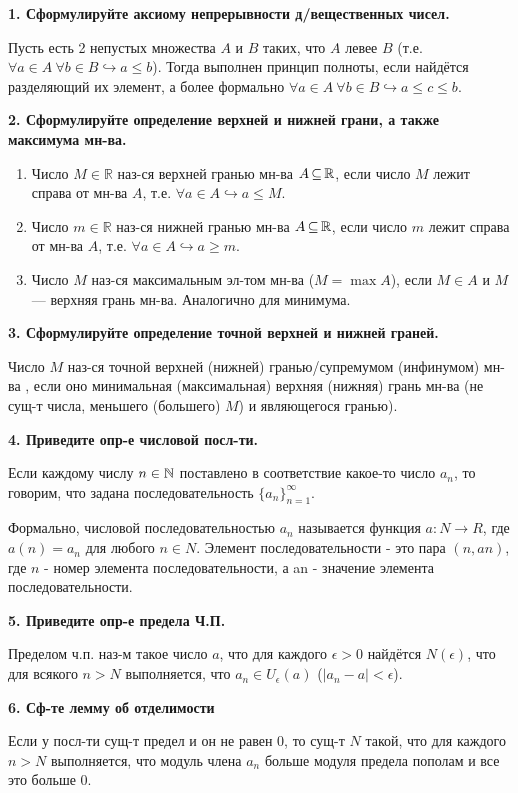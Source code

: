 


	\textbf{1. Сформулируйте аксиому непрерывности д/вещественных чисел.}
	
	Пусть есть 2 непустых множества $A$ и $B$ таких, что $A$ левее $B$ (т.е. $\forall a \in A \ \forall b \in B \hookrightarrow a \le b$). Тогда выполнен принцип полноты, если найдётся разделяющий их элемент, а более формально $\forall a \in A \ \forall b \in B \hookrightarrow a\le c \le b$.
	
	\textbf{2. Сформулируйте определение верхней и нижней грани, а также максимума мн-ва.}
	
	\begin{enumerate}
		\item Число $M \in \mathbb{R}$ наз-ся верхней гранью мн-ва $A \operatorname{\subseteq} \mathbb{R}$, если число $M$ лежит справа от мн-ва $A$, т.е. $\forall a \in A \hookrightarrow a \le M$.
		
		\item Число $m \in \mathbb{R}$ наз-ся нижней гранью мн-ва $A \operatorname{\subseteq} \mathbb{R}$, если число $m$ лежит справа от мн-ва $A$, т.е. $\forall a \in A \hookrightarrow a \ge m$.
		
		\item Число $M$ наз-ся максимальным эл-том мн-ва ($M = \max A$), если $M \in A$ и $M$ --- верхняя грань мн-ва. Аналогично для минимума.
	\end{enumerate}
	
	\textbf{3. Сформулируйте определение точной верхней и нижней граней. }
	
	Число $M$ наз-ся точной верхней (нижней) гранью/супремумом (инфинумом) мн-ва , если оно минимальная (максимальная) верхняя (нижняя) грань мн-ва (не сущ-т числа, меньшего (большего) $M$) и являющегося гранью).
	
	\textbf{4. Приведите опр-е числовой посл-ти. }
	
	Если каждому числу $n \in \mathbb{N}$ поставлено в соответствие какое-то число $a_n$, то говорим, что задана последовательность $ \textstyle\{a_n\}_{n=1}^{\infty}$.
	
	Формально, числовой последовательностью ${a_n}$ называется функция $a : N \rightarrow R$, где
	$a(n) = a_n$ для любого $n\in N$. Элемент последовательности - это пара $(n, an)$, где $n$ - номер
	элемента последовательности, а an - значение элемента последовательности.
	
	\textbf{5. Приведите опр-е предела Ч.П.}
	
	Пределом ч.п. наз-м такое число $a$, что для каждого $\epsilon > 0$ найдётся $N(\epsilon)$, что для всякого $n > N$ выполняется, что $a_n \in U_\epsilon(a)$ ($|a_n - a| < \epsilon$).
	
	\textbf{6. Сф-те лемму об отделимости}
	
	Если у посл-ти сущ-т предел и он не равен 0, то сущ-т $N$ такой,  что для каждого $n > N$ выполняется, что модуль члена $a_n$ больше модуля предела пополам и все это больше 0.

